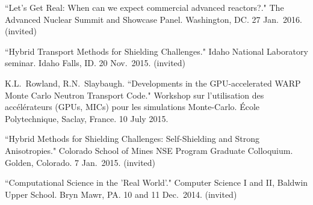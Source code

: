 \begin{bibsection}
\item ``Let’s Get Real: When can we expect commercial
advanced reactors?." The Advanced Nuclear Summit and Showcase Panel. Washington, DC. 27 Jan.\ 2016. (invited)

\item ``Hybrid Transport Methods for Shielding Challenges." Idaho National Laboratory seminar. Idaho Falls, ID. 20 Nov.\ 2015. (invited) 

\item K.L.\ Rowland, R.N.\ Slaybaugh. ``Developments in the GPU-accelerated WARP Monte Carlo Neutron Transport Code." Workshop sur l'utilisation des acc\'{e}l\'{e}rateurs (GPUs, MICs) pour les simulations Monte-Carlo. \'{E}cole Polytechnique, Saclay, France. 10 July 2015. 






\item ``Hybrid Methods for Shielding Challenges: Self-Shielding and Strong Anisotropies." Colorado School of Mines NSE Program Graduate Colloquium. Golden, Colorado. 7 Jan.\ 2015. (invited)

\item ``Computational Science in the 'Real World'." Computer Science I and II, Baldwin Upper School. Bryn Mawr, PA. 10 and 11 Dec.\ 2014. (invited)


\end{bibsection}
